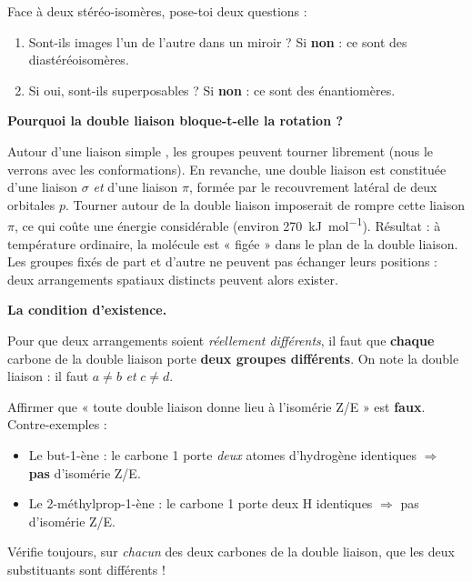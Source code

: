 \documentclass[11pt]{article}
\newcommand{\cle}[1]{{\popxbold\color{popdark}#1}}
\newcounter{popsec}
\newcounter{popsub}
\newcommand{\courssub}[1]{%
  \stepcounter{popsub}%
  \par\vspace{9pt}\noindent{\popxbold\fontsize{11.5}{13}\selectfont\color{popink}{\color{poporange}\thepopsec.\thepopsub}\hspace{6pt}#1}\par\nopagebreak\vspace{4pt}
}
\begin{document}
\begin{aretenir}
Face à deux stéréo-isomères, pose-toi deux questions :
\begin{enumerate}
\item Sont-ils images l'un de l'autre dans un miroir ? Si \textbf{non} : ce sont des \cle{diastéréoisomères}.
\item Si oui, sont-ils superposables ? Si \textbf{non} : ce sont des \cle{énantiomères}.
\end{enumerate}
\end{aretenir}

\courssub{L'isomérie Z/E des alcènes}

\textbf{Pourquoi la double liaison bloque-t-elle la rotation ?}\par
Autour d'une liaison simple , les groupes peuvent tourner librement (nous le verrons avec les conformations). En revanche, une double liaison  est constituée d'une liaison $\sigma$ \emph{et} d'une liaison $\pi$, formée par le recouvrement latéral de deux orbitales $p$. Tourner autour de la double liaison imposerait de rompre cette liaison $\pi$, ce qui coûte une énergie considérable (environ \SI{270}{kJ.mol^{-1}}). Résultat : à température ordinaire, la molécule est « figée » dans le plan de la double liaison. Les groupes fixés de part et d'autre ne peuvent pas échanger leurs positions : deux arrangements spatiaux distincts peuvent alors exister.

\textbf{La condition d'existence.}\par
Pour que deux arrangements soient \emph{réellement différents}, il faut que \textbf{chaque} carbone de la double liaison porte \textbf{deux groupes différents}. On note la double liaison  : il faut $a \neq b$ \emph{et} $c \neq d$.

\begin{attention}
Affirmer que « toute double liaison  donne lieu à l'isomérie Z/E » est \textbf{faux}. Contre-exemples :
\begin{itemize}
\item Le but-1-ène  : le carbone 1 porte \emph{deux} atomes d'hydrogène identiques $\Rightarrow$ \textbf{pas} d'isomérie Z/E.
\item Le 2-méthylprop-1-ène  : le carbone 1 porte deux H identiques $\Rightarrow$ pas d'isomérie Z/E.
\end{itemize}
Vérifie toujours, sur \emph{chacun} des deux carbones de la double liaison, que les deux substituants sont différents !
\end{attention}
\end{document}
